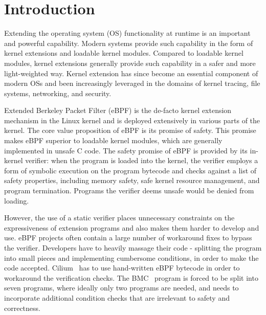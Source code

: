 \section{Introduction}

Extending the operating system (OS) functionality at runtime is an
    important and powerful capability.
Modern systems provide such capability in the form of kernel extensions and
    loadable kernel modules.
Compared to loadable kernel modules, kernel extensions generally provide such
    capability in a safer and more light-weighted way.
Kernel extension has since become an essential component of modern OSs and
    been increasingly leveraged in the domains of kernel tracing, file systems,
    networking, and security.

Extended Berkeley Packet Filter (eBPF) is the de-facto kernel extension
    mechanism in the Linux kernel and is deployed extensively in various
    parts of the kernel.
The core value proposition of eBPF is its promise of safety.
This promise makes eBPF superior to loadable kernel modules, which are
    generally implemented in unsafe C code.
The safety promise of eBPF is provided by its in-kernel verifier:
when the program is loaded into the kernel, the verifier employs a form of symbolic
    execution on the program bytecode and checks against a list of safety
    properties, including memory safety, safe kernel resource management, and
    program termination. 
Programs the verifier deems unsafe would be denied from loading.

However, the use of a static verifier places unnecessary constraints on the
    expressiveness of extension programs and also makes them harder to develop
    and use.
eBPF projects often contain a large number of workaround fixes to bypass the
    verifier.
Developers have to heavily massage their code - splitting the program
    into small pieces and implementing cumbersome conditions, in order to
    make the code accepted.
Cilium~\cite{cilium} has to use hand-written eBPF bytecode in order to
    workaround the verification checks.
The BMC~\cite{BMC} program is forced to be split into seven
    programs, where ideally only two programs are needed, and needs to
    incorporate additional condition checks that are irrelevant to safety and
    correctness.

